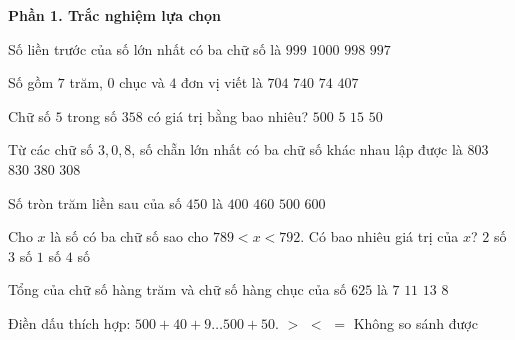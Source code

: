 \textbf{Phần 1. Trắc nghiệm lựa chọn}

\begin{ex} %
Số liền trước của số lớn nhất có ba chữ số là
\choice
{$999$}
{$1 000$}
{\True $998$}
{$997$}
\end{ex}

\begin{ex} %
Số gồm $7$ trăm, $0$ chục và $4$ đơn vị viết là
\choice
{\True $704$}
{$740$}
{$74$}
{$407$}
\end{ex}

\begin{ex} %
Chữ số $5$ trong số $358$ có giá trị bằng bao nhiêu?
\choice
{$500$}
{$5$}
{$15$}
{\True $50$}
\end{ex}

\begin{ex} %
Từ các chữ số $3, 0, 8$, số chẵn lớn nhất có ba chữ số khác nhau lập được là
\choice
{$803$}
{\True $830$}
{$380$}
{$308$}
\end{ex}

\begin{ex} %
Số tròn trăm liền sau của số $450$ là
\choice
{$400$}
{$460$}
{\True $500$}
{$600$}
\end{ex}

\begin{ex} %
Cho $x$ là số có ba chữ số sao cho $789 < x < 792$. Có bao nhiêu giá trị của $x$?
\choice
{\True $2$ số}
{$3$ số}
{$1$ số}
{$4$ số}
\end{ex}

\begin{ex} %
Tổng của chữ số hàng trăm và chữ số hàng chục của số $625$ là
\choice
{$7$}
{$11$}
{$13$}
{\True $8$}
\end{ex}

\begin{ex} %
Điền dấu thích hợp: $500 + 40 + 9 \dots 500 + 50$.
\choice
{$>$}
{\True $<$}
{$=$}
{Không so sánh được}
\end{ex}

